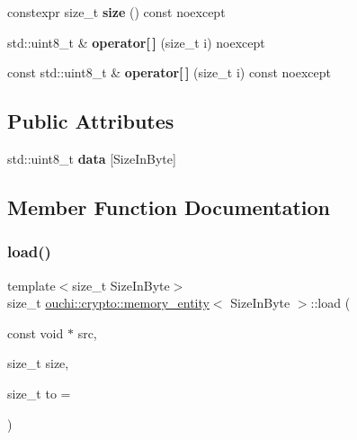 \begin{DoxyCompactItemize}
\mbox{\label{structouchi_1_1crypto_1_1memory__entity_a1e6f4fe50a11a9d6565862f0cab599a7}} 
constexpr size\+\_\+t {\bfseries size} () const noexcept
\item 
\mbox{\label{structouchi_1_1crypto_1_1memory__entity_afece6e6cb16e435909f4823362bed5ad}} 
std\+::uint8\+\_\+t \& {\bfseries operator\mbox{[}$\,$\mbox{]}} (size\+\_\+t i) noexcept
\item 
\mbox{\label{structouchi_1_1crypto_1_1memory__entity_a0ce62fa0e683c45fcb34049c1eeacf10}} 
const std\+::uint8\+\_\+t \& {\bfseries operator\mbox{[}$\,$\mbox{]}} (size\+\_\+t i) const noexcept
\end{DoxyCompactItemize}
\subsection*{Public Attributes}
\begin{DoxyCompactItemize}
\item 
\mbox{\label{structouchi_1_1crypto_1_1memory__entity_ad0b770fd59fba46d7d936034b11905b0}} 
std\+::uint8\+\_\+t {\bfseries data} \mbox{[}Size\+In\+Byte\mbox{]}
\end{DoxyCompactItemize}


\subsection{Member Function Documentation}
\mbox{\label{structouchi_1_1crypto_1_1memory__entity_a64914a9119c3a872fcae17517045eb8e}} 
\subsubsection{\texorpdfstring{load()}{load()}}
{\footnotesize\ttfamily template$<$size\+\_\+t Size\+In\+Byte$>$ \\
size\+\_\+t \mbox{\hyperlink{structouchi_1_1crypto_1_1memory__entity}{ouchi\+::crypto\+::memory\+\_\+entity}}$<$ Size\+In\+Byte $>$\+::load (\begin{DoxyParamCaption}\item[{const void $\ast$}]{src,  }\item[{size\+\_\+t}]{size,  }\item[{size\+\_\+t}]{to = {} }\end{DoxyParamCaption})\hspace{0.3cm}{\ttfamily [inline]}}



